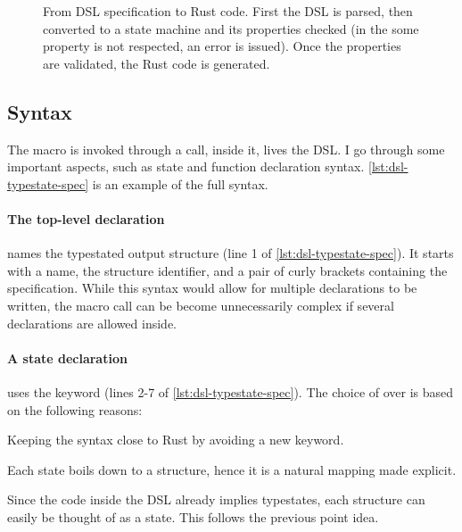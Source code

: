 \begin{figure}
    \caption{
        From DSL specification to Rust code.
        First the DSL is parsed, then converted to a state machine and its properties checked
        (in the some property is not respected, an error is issued).
        Once the properties are validated, the Rust code is generated.
    }
    \label{fig:dsl-processing}
\end{figure}

\subsection{Syntax}\label{sec:arch:syntax}

The macro is invoked through a  call, inside it, lives the DSL.
I go through some important aspects, such as state and function declaration syntax.
\autoref{lst:dsl-typestate-spec} is an example of the full syntax.

\paragraph{The top-level declaration} names the typestated output structure (line 1 of \autoref{lst:dsl-typestate-spec}).
It starts with a name, the structure identifier, and a pair of curly brackets containing the specification.
While this syntax would allow for multiple declarations to be written,
the macro call can be become unnecessarily complex if several declarations are allowed inside.

\paragraph{A state declaration} uses the  keyword (lines 2-7 of \autoref{lst:dsl-typestate-spec}).
The choice of  over  is based on the following reasons:
\begin{compactitem}
    \item Keeping the syntax close to Rust by avoiding a new keyword.
    \item Each state boils down to a structure, hence it is a natural mapping made explicit.
    \item Since the code inside the DSL already implies typestates, each structure can easily be thought of as a state.
    This follows the previous point idea.
\end{compactitem}

